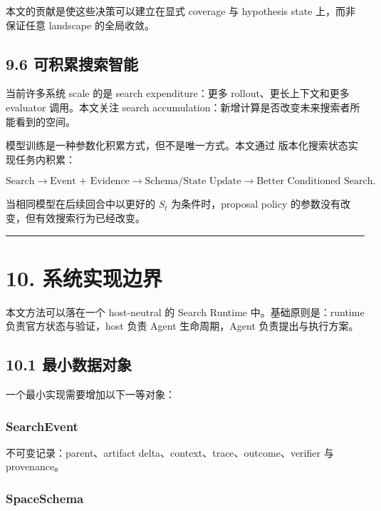 \documentclass[
  11pt]{ctexart}
\begin{document}
本文的贡献是使这些决策可以建立在显式 coverage 与 hypothesis state
上，而非保证任意 landscape 的全局收敛。

\subsection{9.6
可积累搜索智能}\label{ux53efux79efux7d2fux641cux7d22ux667aux80fd}

当前许多系统 scale 的是 search expenditure：更多
rollout、更长上下文和更多 evaluator 调用。本文关注 search
accumulation：新增计算是否改变未来搜索者所能看到的空间。

模型训练是一种参数化积累方式，但不是唯一方式。本文通过
版本化搜索状态实现任务内积累：

\[
\text{Search}
\rightarrow
\text{Event + Evidence}
\rightarrow
\text{Schema/State Update}
\rightarrow
\text{Better Conditioned Search}.
\]

当相同模型在后续回合中以更好的 \(S_t\) 为条件时，proposal policy
的参数没有改变，但有效搜索行为已经改变。

\begin{center}\rule{0.5\linewidth}{0.5pt}\end{center}

\section{10. 系统实现边界}\label{ux7cfbux7edfux5b9eux73b0ux8fb9ux754c}

本文方法可以落在一个 host-neutral 的 Search Runtime
中。基础原则是：runtime 负责官方状态与验证，host 负责 Agent
生命周期，Agent 负责提出与执行方案。

\subsection{10.1
最小数据对象}\label{ux6700ux5c0fux6570ux636eux5bf9ux8c61}

一个最小实现需要增加以下一等对象：

\subsubsection{SearchEvent}\label{searchevent}

不可变记录：parent、artifact delta、context、trace、outcome、verifier 与
provenance。

\subsubsection{SpaceSchema}\label{spaceschema}
\end{document}

